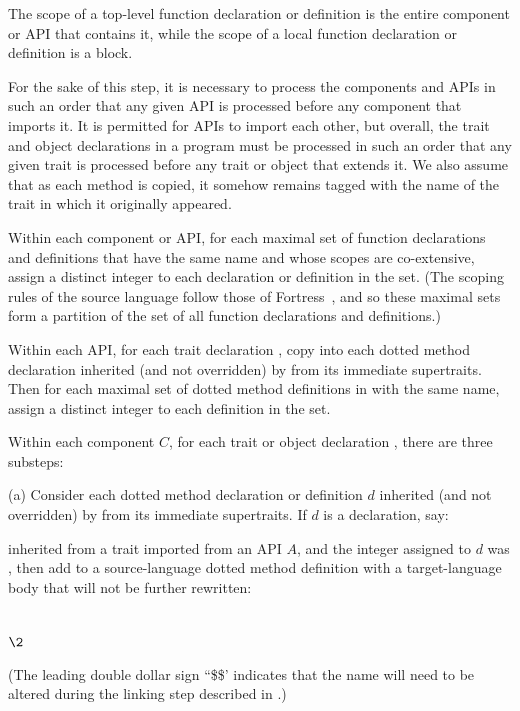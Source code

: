 The scope of a top-level function declaration or definition
is the entire component or API that contains it, while the scope of
a local function declaration or definition is a block.

For the sake of this step, it is necessary to process the components and APIs
in such an order that any given API is processed before any component
that imports it.  It is permitted for APIs to import each other,
but overall, the trait and object declarations in a program must be
processed in such an order that any given trait is processed before
any trait or object that extends it.
We also assume that as each method is copied,
it somehow remains tagged with the name of the trait in which it originally appeared.

Within each component or API, for each maximal set of function
declarations and definitions that have the same name and whose
scopes are co-extensive, assign a distinct integer to each declaration
or definition in the set.  (The scoping rules of
the source language follow those of Fortress~\cite{FORTRESS-1-0}, and so these maximal sets
form a partition of the set of all function declarations and definitions.)

Within each API, for each trait declaration , copy into
 each dotted method declaration inherited (and not overridden) by
 from its immediate supertraits.  Then for each maximal set of
dotted method definitions in  with the same name, assign a
distinct integer to each definition in the set.

Within each component $C$, for each trait or object declaration ,
there are three substeps:

(a) Consider each dotted method declaration or definition $d$ inherited (and
not overridden) by  from its immediate supertraits.
If $d$ is a declaration, say:
\begin{codeexamplesize}
\begin{tabbing}
\end{tabbing}
\end{codeexamplesize}
inherited from a trait  imported from an API $A$, and the integer assigned
to $d$ was , then
add to  a source-language dotted method definition
with a target-language body that will not be further rewritten:
\begin{codeexamplesize}
\begin{tabbing}
 \\
\(\2\)
\end{tabbing}
\end{codeexamplesize}
(The leading double dollar sign ``\$\$' indicates
that the name  will
need to be altered during the linking step described in .)


